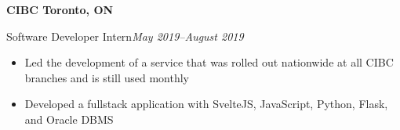 \textbf{CIBC \hfill Toronto, ON}\par

Software Developer Intern\hfill \textit{May 2019--August 2019}
\begin{itemize}
    \item Led the development of a service that was rolled out nationwide at all CIBC branches and is still used monthly
    \item Developed a fullstack application with SvelteJS, JavaScript, Python, Flask, and Oracle DBMS
\end{itemize}
